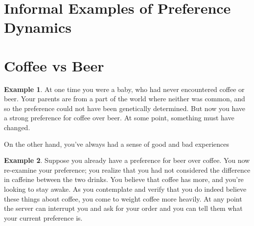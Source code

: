\documentclass{article}
\theoremstyle{plain}
\theoremstyle{definition}
\newtheorem{example}{Example}[section]
\theoremstyle{remark}
\begin{document}
	\section{Informal Examples of Preference Dynamics}
%	


	\section{Coffee vs Beer}
	\begin{example}
		At one time you were a baby, who had never encountered coffee or beer. Your parents are from a part of the world where neither was common, and so the preference could not have been genetically determined. But now you have a strong preference for coffee over beer. At some point, something must have changed.
		
		On the other hand, you've always had a sense of good and bad experiences
	\end{example}
	
	\begin{example}
		Suppose you already have a preference for beer over coffee. You now re-examine your preference; you realize that you had not considered the difference in caffeine between the two drinks. You believe that coffee has more, and you're looking to stay awake. As you contemplate and verify that you do indeed believe these things about coffee, you come to weight coffee more heavily. At any point the server can interrupt you and ask for your order and you can tell them what your current preference is.
	\end{example}
\end{document}
